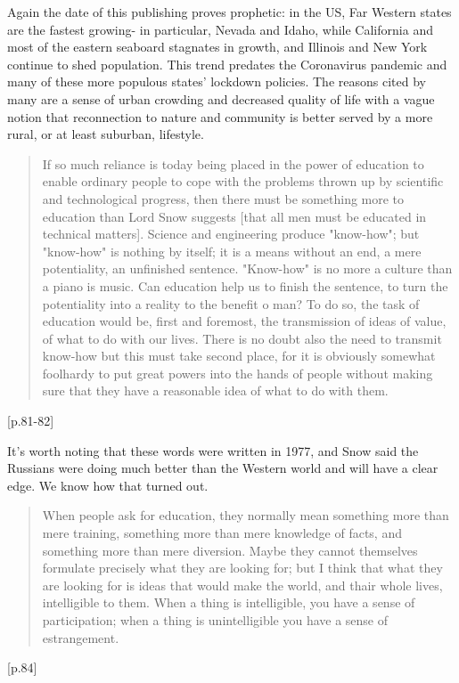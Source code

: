 \documentclass[letterpaper]{article}
\begin{document}
Again the date of this publishing proves prophetic: in the US, Far Western states are the fastest growing- in particular, Nevada and Idaho, while California and most of the eastern seaboard stagnates in growth, and Illinois and New York continue to shed population. This trend predates the Coronavirus pandemic and many of these more populous states' lockdown policies. The reasons cited by many are a sense of urban crowding and decreased quality of life with a vague notion that reconnection to nature and community is better served by a more rural, or at least suburban, lifestyle.

\begin{quote}
If so much reliance is today being placed in the power of education to enable ordinary people to cope with the problems thrown up by scientific and technological progress, then there must be something more to education than Lord Snow suggests [that all men must be educated in technical matters]. Science and engineering produce "know-how"; but "know-how" is nothing by itself; it is a means without an end, a mere potentiality, an unfinished sentence. "Know-how" is no more a culture than a piano is music. Can education help us to finish the sentence, to turn the potentiality into a reality to the benefit o man? To do so, the task of education would be, first and foremost, the transmission of ideas of value, of what to do with our lives. There is no doubt also the need to transmit know-how but this must take second place, for it is obviously somewhat foolhardy to put great powers into the hands of people without making sure that they have a reasonable idea of what to do with them.
\end{quote}[p.81-82]

It's worth noting that these words were written in 1977, and Snow said the Russians were doing much better than the Western world and will have a clear edge. We know how that turned out.

\begin{quote}
When people ask for education, they normally mean something more than mere training, something more than mere knowledge of facts, and something more than mere diversion. Maybe they cannot themselves formulate precisely what they are looking for; but I think that what they are looking for is ideas that would make the world, and thair whole lives, intelligible to them. When a thing is intelligible, you have a sense of participation; when a thing is unintelligible you have a sense of estrangement.
\end{quote}[p.84]
\end{document}
